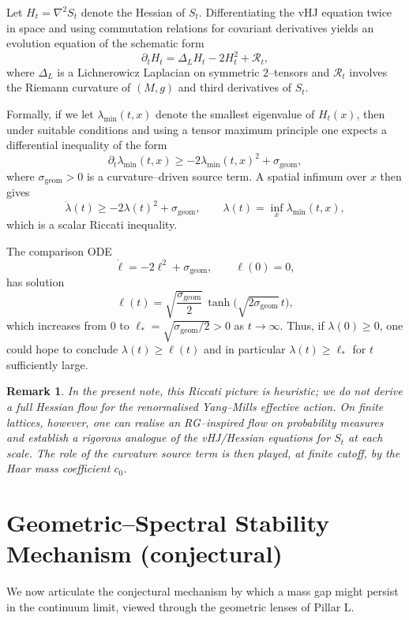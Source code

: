 \documentclass[11pt]{article}
\numberwithin{equation}{section}
\newtheorem{remark}[theorem]{Remark}
\begin{document}
Let $H_t = \nabla^2 S_t$ denote the Hessian of $S_t$.  Differentiating
the vHJ equation twice in space and using commutation relations for
covariant derivatives yields an evolution equation of the schematic form
\[
  \partial_t H_t = \Delta_L H_t - 2H_t^2 + \mathcal{R}_t,
\]
where $\Delta_L$ is a Lichnerowicz Laplacian on symmetric $2$--tensors
and $\mathcal{R}_t$ involves the Riemann curvature of $(M,g)$ and third
derivatives of $S_t$.

Formally, if we let $\lambda_{\min}(t,x)$ denote the smallest eigenvalue
of $H_t(x)$, then under suitable conditions and using a tensor maximum
principle one expects a differential inequality of the form
\[
  \partial_t \lambda_{\min}(t,x)
  \ge -2\lambda_{\min}(t,x)^2 + \sigma_{\mathrm{geom}},
\]
where $\sigma_{\mathrm{geom}}>0$ is a curvature--driven source term.  A
spatial infimum over $x$ then gives
\[
  \dot\lambda(t) \ge -2\lambda(t)^2 + \sigma_{\mathrm{geom}},\qquad
  \lambda(t) = \inf_x \lambda_{\min}(t,x),
\]
which is a scalar Riccati inequality.

The comparison ODE
\[
  \dot\ell = -2\ell^2 + \sigma_{\mathrm{geom}},\qquad \ell(0)=0,
\]
has solution
\[
  \ell(t) = \sqrt{\frac{\sigma_{\mathrm{geom}}}{2}}\,
            \tanh\big(\sqrt{2\sigma_{\mathrm{geom}}}\,t\big),
\]
which increases from $0$ to
$\ell_*=\sqrt{\sigma_{\mathrm{geom}}/2}>0$ as $t\to\infty$.  Thus, if
$\lambda(0)\ge 0$, one could hope to conclude $\lambda(t)\ge\ell(t)$ and
in particular $\lambda(t)\ge\ell_*$ for $t$ sufficiently large.

\begin{remark}
In the present note, this Riccati picture is heuristic; we do not derive
a full Hessian flow for the renormalised Yang--Mills effective action.
On finite lattices, however, one can realise an RG--inspired flow on
probability measures and establish a rigorous analogue of the vHJ/Hessian
equations for $S_t$ at each scale.  The role of the curvature source
term is then played, at finite cutoff, by the Haar mass coefficient
$c_0$.
\end{remark}

\section{Geometric--Spectral Stability Mechanism (conjectural)}

We now articulate the conjectural mechanism by which a mass gap might
persist in the continuum limit, viewed through the geometric lenses of
Pillar L.
\end{document}
